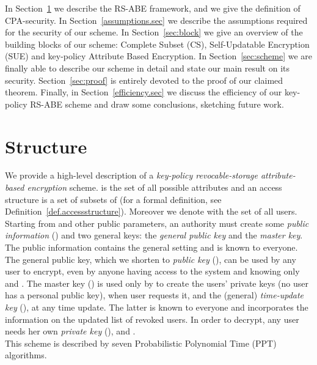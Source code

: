 \documentclass[a4paper,10pt]{article}
\begin{document}
	
	In Section~\ref{sec:structure} we describe the RS-ABE framework, and we give the definition of CPA-security. In Section~\ref{assumptions.sec} we describe the assumptions required for the security of our scheme. In Section~\ref{sec:block} we give an overview of the building blocks of our scheme: Complete Subset (CS), Self-Updatable Encryption (SUE) and key-policy Attribute Based Encryption. In Section~\ref{sec:scheme} we are finally able to describe our scheme in detail and  state our main result on its security.  Section~\ref{sec:proof} is entirely devoted to the proof of our claimed theorem. Finally, in Section~\ref{efficiency.sec} we discuss the efficiency of our key-policy RS-ABE scheme and draw some conclusions, sketching future work.
	


	\section{Structure}\label{sec:structure}
	We provide a high-level description of a \emph{key-policy revocable-storage at\-tri\-bute-based encryption} scheme.  is the set of all possible attributes and an access structure  is a set of subsets of  (for a formal definition, see Definition~\ref{def.accessstructure}). Moreover we denote with  the set of all users. 
	Starting from  and other public parameters, an authority   must create some \emph{public information} () and two general keys:  the \emph{general public key} and the \emph{master key}. The public information contains the general setting and is known to everyone. The general public key, which we shorten to \emph{public key} (), can be used by any user to encrypt, even by anyone having access to the system and knowing only  and . The master key () is used only by 
	 to create the users' private keys (no user has a personal public key), when user requests it, and the (general) \emph{time-update key} (), at any time update. The latter is known to everyone and incorporates the information on the updated list of revoked users. In order to decrypt, any user needs her own \emph{private key} (),  and .\\
	This scheme is described by seven Probabilistic Polynomial Time (PPT) algorithms. 
\end{document}

